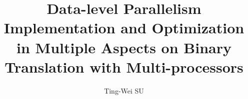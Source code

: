 \documentclass[sigconf, nonacm, natbib=false]{acmart}
\begin{document}

\author{Ting-Wei SU}

\renewcommand\footnotetextcopyrightpermission[1]{} %

\title{Data-level Parallelism Implementation and Optimization in Multiple Aspects on Binary Translation with Multi-processors}
\end{document}
